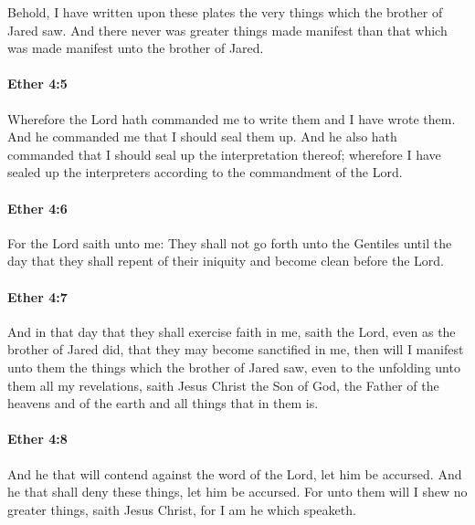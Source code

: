 			Behold, I have written upon these plates
			the very things which the brother of Jared saw.
			And there never was greater things made manifest
			than that which was made manifest unto the brother of Jared.

		\paragraph{Ether 4:5} %
			\label{ETHER-4-5}

			Wherefore the Lord hath commanded me to write them
			and I have wrote them.
			And he commanded me that I should seal them up.
			And he also hath commanded that I should seal up the interpretation thereof;
			wherefore I have sealed up the interpreters
			according to the commandment of the Lord.

		\paragraph{Ether 4:6} %
			\label{ETHER-4-6}

			For the Lord saith unto me:
			They shall not go forth unto the Gentiles
			until the day that they shall repent of their iniquity
			and become clean before the Lord.

		\paragraph{Ether 4:7} %
			\label{ETHER-4-7}

			And in that day that they shall exercise faith in me, saith the Lord,
			even as the brother of Jared did,
			that they may become sanctified in me,
			then will I manifest unto them the things which the brother of Jared saw,
			even to the unfolding unto them all my revelations,
			saith Jesus Christ the Son of God,
			the Father of the heavens and of the earth and all things that in them is.

		\paragraph{Ether 4:8} %
			\label{ETHER-4-8}

			And he that will contend against the word of the Lord, let him be accursed.
			And he that shall deny these things, let him be accursed.
			For unto them will I shew no greater things, saith Jesus Christ,
			for I am he which speaketh.

